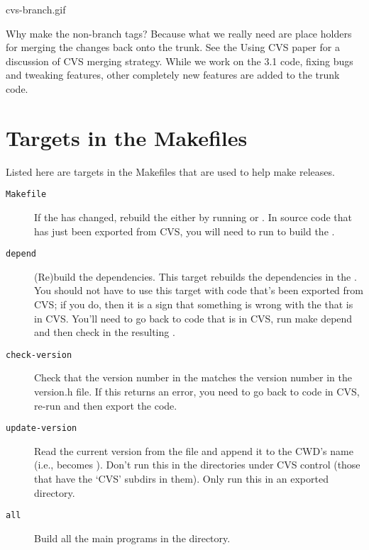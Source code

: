 \documentclass{dods-paper}
\begin{document}
%
	    {cvs-branch.gif}{}

Why make the non-branch tags? Because what we really need are place holders
for merging the changes back onto the trunk. See the Using CVS paper for a
discussion of CVS merging strategy. While we work on the 3.1 code, fixing
bugs and tweaking features, other completely new features are added to the
trunk code.

\section{Targets in the Makefiles}

Listed here are targets in the Makefiles that are used to help make releases.

\begin{description}
\item[\texttt{Makefile}] If the  has changed, rebuild the
   either by running  or . In
  source code that has just been exported from CVS, you will need to run
   to build the .

\item[\texttt{depend}] (Re)build the dependencies. This target rebuilds the
  dependencies in the . You should not have to use this
  target with code that's been exported from CVS; if you do, then it is a
  sign that something is wrong with the  that is in CVS.
  You'll need to go back to code that is in CVS, run make depend and then
  check in the resulting .

\item[\texttt{check-version}] Check that the version number in the
   matches the version number in the version.h file. If this
  returns an error, you need to go back to code in CVS, re-run
   and then export the code.

\item[\texttt{update-version}] Read the current version from the
   file and append it to the CWD's name (i.e., 
  becomes ). Don't run this in the directories under CVS
  control (those that have the `CVS' subdirs in them). Only run this in an
  exported directory.

\item[\texttt{all}] Build all the main programs in the directory. 


\end{description}
\end{document}

